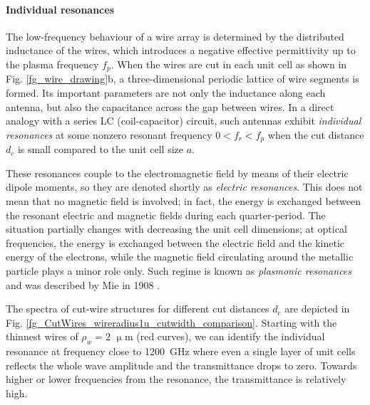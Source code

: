 \paragraph{Individual resonances}%
The low-frequency behaviour of a wire array is determined by the distributed inductance of the wires, which introduces a negative effective permittivity up to the plasma frequency $f_p$. When the wires are cut in each unit cell as shown in Fig. \ref{fg_wire_drawing}b, a three-dimensional periodic lattice of wire segments is formed. Its important parameters are not only the inductance along each antenna, but also the capacitance across the gap between wires. In a direct analogy with a series LC (coil-capacitor) circuit, such antennas exhibit \textit{individual resonances} at some nonzero resonant frequency $0<f_r<f_p$ when the cut distance  $d_c$ is small compared to the unit cell size $a$. 

These resonances couple to the electromagnetic field by means of their electric dipole moments, so they are denoted shortly as \textit{electric resonances}. This does not mean that no magnetic field is involved; in fact, the energy is exchanged between the resonant electric and magnetic fields during each quarter-period. The situation partially changes with decreasing the unit cell dimensions; at optical frequencies, the energy is exchanged between the electric field and the kinetic energy of the electrons, while the magnetic field circulating around the metallic particle plays a minor role only. Such regime is known as \textit{plasmonic resonances} and was described by Mie in 1908 \cite{mie1908beitrage}.

The spectra of cut-wire structures for different cut distances $d_c$ are depicted in Fig. \ref{fg_CutWires_wireradius1u_cutwidth_comparison}. Starting with the thinnest wires of $\rho_w = 2$ $\upmu$m (red curves), we can identify the individual resonance at frequency close to  1200~GHz where even a single layer of unit cells reflects the whole wave amplitude and the transmittance drops to zero. Towards higher or lower frequencies from the resonance, the transmittance is relatively high.

